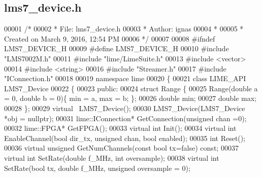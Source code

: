\subsection{lms7\+\_\+device.\+h}
\label{lms7__device_8h_source}

\begin{DoxyCode}
00001 \textcolor{comment}{/*}
00002 \textcolor{comment}{ * File:   lms7\_device.h}
00003 \textcolor{comment}{ * Author: ignas}
00004 \textcolor{comment}{ *}
00005 \textcolor{comment}{ * Created on March 9, 2016, 12:54 PM}
00006 \textcolor{comment}{ */}
00007 
00008 \textcolor{preprocessor}{#ifndef LMS7\_DEVICE\_H}
00009 \textcolor{preprocessor}{#define LMS7\_DEVICE\_H}
00010 \textcolor{preprocessor}{#include "LMS7002M.h"}
00011 \textcolor{preprocessor}{#include "lime/LimeSuite.h"}
00013 \textcolor{preprocessor}{#include <vector>}
00014 \textcolor{preprocessor}{#include <string>}
00016 \textcolor{preprocessor}{#include "Streamer.h"}
00017 \textcolor{preprocessor}{#include "IConnection.h"}
00018 
00019 \textcolor{keyword}{namespace }lime
00020 \{
00021 \textcolor{keyword}{class }LIME_API LMS7_Device
00022 \{
00023 \textcolor{keyword}{public}:
00024     \textcolor{keyword}{struct }Range \{
00025         Range(\textcolor{keywordtype}{double} a = 0, \textcolor{keywordtype}{double} b = 0)\{ min = a, max = b; \};
00026         \textcolor{keywordtype}{double} min;
00027         \textcolor{keywordtype}{double} max;
00028     \};
00029     \textcolor{keyword}{virtual} ~LMS7_Device();
00030     LMS7_Device(LMS7_Device *obj = \textcolor{keyword}{nullptr});
00031     lime::IConnection* GetConnection(\textcolor{keywordtype}{unsigned} chan =0);
00032     lime::FPGA* GetFPGA();
00033     \textcolor{keyword}{virtual} \textcolor{keywordtype}{int} Init();
00034     \textcolor{keyword}{virtual} \textcolor{keywordtype}{int} EnableChannel(\textcolor{keywordtype}{bool} dir_tx, \textcolor{keywordtype}{unsigned} chan, \textcolor{keywordtype}{bool} enabled);
00035     \textcolor{keywordtype}{int} Reset();
00036     \textcolor{keyword}{virtual} \textcolor{keywordtype}{unsigned} GetNumChannels(\textcolor{keyword}{const} \textcolor{keywordtype}{bool} tx=\textcolor{keyword}{false}) \textcolor{keyword}{const};
00037     \textcolor{keyword}{virtual} \textcolor{keywordtype}{int} SetRate(\textcolor{keywordtype}{double} f\_MHz, \textcolor{keywordtype}{int} oversample);
00038     \textcolor{keyword}{virtual} \textcolor{keywordtype}{int} SetRate(\textcolor{keywordtype}{bool} tx, \textcolor{keywordtype}{double} f\_MHz, \textcolor{keywordtype}{unsigned} oversample = 0);

\end{DoxyCode}
